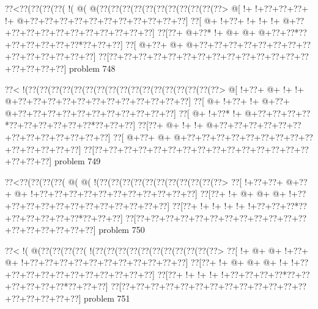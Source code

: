 \vbox{\vbox{\goo
\0??<\0??(\0??(\0??(\0??(\- !(\- @(\- @(\0??(\0??(\0??(\0??(\0??(\0??(\0??(\0??(\0??(\0??(\0??>
\- @[\- !+\- !+\0??+\0??+\0??+\- !+\- @+\0??+\0??+\0??+\0??+\0??+\0??+\0??+\0??+\0??+\0??+\0??]
\0??[\- @+\- !+\0??+\- !+\- !+\- !+\- @+\0??+\0??+\0??+\0??+\0??+\0??+\0??+\0??+\0??+\0??+\0??]
\0??[\0??+\- @+\0??*\- !+\- @+\- @+\- @+\0??+\0??*\0??+\0??+\0??+\0??+\0??+\0??*\0??+\0??+\0??]
\0??[\- @+\0??+\- @+\- @+\0??+\0??+\0??+\0??+\0??+\0??+\0??+\0??+\0??+\0??+\0??+\0??+\0??+\0??]
\0??[\0??+\0??+\0??+\0??+\0??+\0??+\0??+\0??+\0??+\0??+\0??+\0??+\0??+\0??+\0??+\0??+\0??+\0??]
}
\hfil problem 748\hfil\break
}



\vbox{\vbox{\goo
\0??<\- !(\0??(\0??(\0??(\0??(\0??(\0??(\0??(\0??(\0??(\0??(\0??(\0??(\0??(\0??(\0??(\0??(\0??>
\- @[\- !+\0??+\- @+\- !+\- !+\- @+\0??+\0??+\0??+\0??+\0??+\0??+\0??+\0??+\0??+\0??+\0??+\0??]
\0??[\- @+\- !+\0??+\- !+\- @+\0??+\- @+\0??+\0??+\0??+\0??+\0??+\0??+\0??+\0??+\0??+\0??+\0??]
\0??[\- @+\- !+\0??*\- !+\- @+\0??+\0??+\0??+\0??*\0??+\0??+\0??+\0??+\0??+\0??*\0??+\0??+\0??]
\0??[\0??+\- @+\- !+\- !+\- @+\0??+\0??+\0??+\0??+\0??+\0??+\0??+\0??+\0??+\0??+\0??+\0??+\0??]
\0??[\- @+\0??+\- @+\- @+\0??+\0??+\0??+\0??+\0??+\0??+\0??+\0??+\0??+\0??+\0??+\0??+\0??+\0??]
\0??[\0??+\0??+\0??+\0??+\0??+\0??+\0??+\0??+\0??+\0??+\0??+\0??+\0??+\0??+\0??+\0??+\0??+\0??]
}
\hfil problem 749\hfil\break
}



\vbox{\vbox{\goo
\0??<\0??(\0??(\0??(\0??(\- @(\- @(\- !(\0??(\0??(\0??(\0??(\0??(\0??(\0??(\0??(\0??(\0??(\0??>
\0??[\- !+\0??+\0??+\- @+\0??+\- @+\- !+\0??+\0??+\0??+\0??+\0??+\0??+\0??+\0??+\0??+\0??+\0??]
\0??[\0??+\- !+\- @+\- @+\- @+\- !+\0??+\0??+\0??+\0??+\0??+\0??+\0??+\0??+\0??+\0??+\0??+\0??]
\0??[\0??+\- !+\- !+\- !+\- !+\- !+\0??+\0??+\0??*\0??+\0??+\0??+\0??+\0??+\0??*\0??+\0??+\0??]
\0??[\0??+\0??+\0??+\0??+\0??+\0??+\0??+\0??+\0??+\0??+\0??+\0??+\0??+\0??+\0??+\0??+\0??+\0??]
}
\hfil problem 750\hfil\break
}



\vbox{\vbox{\goo
\0??<\- !(\- @(\0??(\0??(\0??(\0??(\- !(\0??(\0??(\0??(\0??(\0??(\0??(\0??(\0??(\0??(\0??(\0??>
\0??[\- !+\- @+\- @+\- !+\0??+\- @+\- !+\0??+\0??+\0??+\0??+\0??+\0??+\0??+\0??+\0??+\0??+\0??]
\0??[\0??+\- !+\- @+\- @+\- @+\- !+\- !+\0??+\0??+\0??+\0??+\0??+\0??+\0??+\0??+\0??+\0??+\0??]
\0??[\0??+\- !+\- !+\- !+\- !+\0??+\0??+\0??+\0??*\0??+\0??+\0??+\0??+\0??+\0??*\0??+\0??+\0??]
\0??[\0??+\0??+\0??+\0??+\0??+\0??+\0??+\0??+\0??+\0??+\0??+\0??+\0??+\0??+\0??+\0??+\0??+\0??]
}
\hfil problem 751\hfil\break
}



